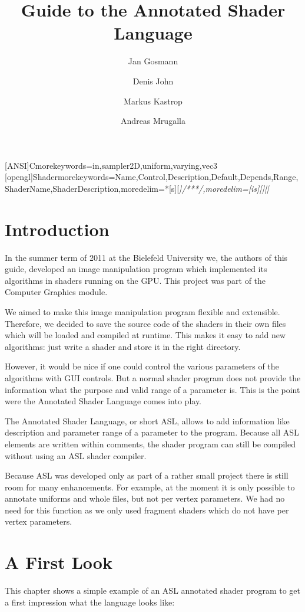 \documentclass[11pt,a4paper]{scrreprt}
\title{Guide to the Annotated Shader Language}
\author{Jan Gosmann \and Denis John \and Markus Kastrop \and Andreas Mrugalla}
\begin{document}
[ANSI]{C}{morekeywords={in,sampler2D,uniform,varying,vec3}}
[opengl]{Shader}{morekeywords={Name,Control,Description,Default,Depends,Range,ShaderName,ShaderDescription},moredelim=*[s][\itshape]{/**}{*/},moredelim=[is][\itshape]{|}{|}}
\maketitle
\tableofcontents

\chapter{Introduction}
In the summer term of 2011 at the Bielefeld University we, the authors of this 
guide, developed an image manipulation program which implemented its algorithms 
in shaders running on the GPU. This project was part of the Computer Graphics 
module.

We aimed to make this image manipulation program flexible and extensible.  
Therefore, we decided to save the source code of the shaders in their own files 
which will be loaded and compiled at runtime. This makes it easy to add new 
algorithms: just write a shader and store it in the right directory.

However, it would be nice if one could control the various parameters of the 
algorithms with GUI controls. But a normal shader program does not provide the 
information what the purpose and valid range of a parameter is. This is the 
point were the Annotated Shader Language comes into play.

The Annotated Shader Language, or short ASL, allows to add information like 
description and parameter range of a parameter to the program. Because all ASL 
elements are written within comments, the shader program can still be compiled 
without using an ASL shader compiler.

Because ASL was developed only as part of a rather small project there is still 
room for many enhancements. For example, at the moment it is only possible to 
annotate uniforms and whole files, but not per vertex parameters. We had no need 
for this function as we only used fragment shaders which do not have per vertex 
parameters.


\chapter{A First Look}
This chapter shows a simple example of an ASL annotated shader program to get 
a first impression what the language looks like:
\end{document}
